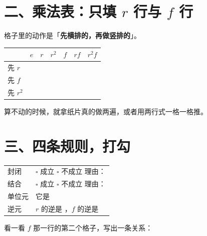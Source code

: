 \documentclass[11pt]{ctexart}
\begin{document}
\section*{二、乘法表：只填 \(r\) 行与 \(f\) 行}

\noindent 格子里的动作是「\textbf{先横排的，再做竖排的}」。

\begin{center}
{\small
\begin{tabular}{@{}l|cccccc@{}}
  \toprule
   & \(e\) & \(r\) & \(r^2\) & \(f\) & \(rf\) & \(r^2f\) \\
  \midrule
  \rule{0pt}{3.2ex}先 \(r\) & & & & & & \\
  \rule{0pt}{3.2ex}先 \(f\) & & & & & & \\
  \rule{0pt}{3.2ex}先 \(r^2\) & & & & & & \\
  \bottomrule
\end{tabular}}
\end{center}

\noindent 算不动的时候，就拿纸片真的做两遍，或者用两行式一格一格推。

\section*{三、四条规则，打勾}

\vspace{0.4em}
\noindent\begin{tabular}{@{}p{2.6cm}p{12.6cm}@{}}
  封闭 & \(\square\) 成立 \quad \(\square\) 不成立 \qquad 理由：\underline{\hspace{5.4cm}} \\
  \rule{0pt}{2.6ex}结合 & \(\square\) 成立 \quad \(\square\) 不成立 \qquad 理由：\underline{\hspace{5.4cm}} \\
  \rule{0pt}{2.6ex}单位元 & 它是 \underline{\hspace{2.2cm}} \\
  \rule{0pt}{2.6ex}逆元 & \(r\) 的逆是 \underline{\hspace{1.4cm}}，\(f\) 的逆是 \underline{\hspace{1.4cm}} \\
\end{tabular}

\vspace{0.6em}
\noindent 看一看 \(f\) 那一行的第二个格子，写出一条关系：\underline{\hspace{6cm}}
\end{document}
